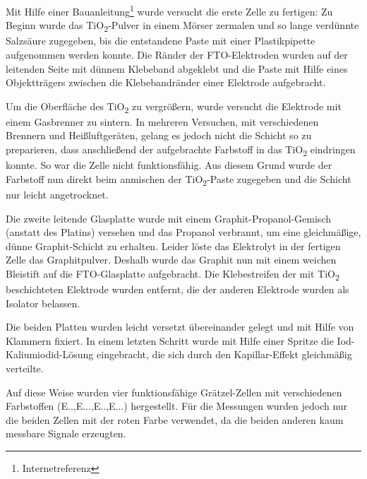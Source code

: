 \documentclass[11pt]{scrartcl}
\begin{document}
Mit Hilfe einer Bauanleitung\footnote{Internetreferenz} wurde versucht die erste Zelle zu fertigen: Zu Beginn wurde das TiO\textsubscript{2}-Pulver in einem Mörser zermalen und so lange verdünnte Salzsäure zugegeben, bis die entstandene Paste mit einer Plastikpipette aufgenommen werden konnte. Die Ränder der FTO-Elektroden wurden auf der leitenden Seite mit dünnem Klebeband abgeklebt und die Paste mit Hilfe eines Objektträgers zwischen die Klebebandränder einer Elektrode aufgebracht.

Um die Oberfläche des TiO\textsubscript{2} zu vergrößern, wurde versucht die Elektrode mit einem Gasbrenner zu sintern. In mehreren Versuchen, mit verschiedenen Brennern und Heißluftgeräten, gelang es jedoch nicht die Schicht so zu preparieren, dass anschließend der aufgebrachte Farbstoff in das TiO\textsubscript{2} eindringen konnte. So war die Zelle nicht funktionsfähig. Aus diesem Grund wurde der Farbstoff nun direkt beim anmischen der TiO\textsubscript{2}-Paste zugegeben und die Schicht nur leicht angetrocknet.

Die zweite leitende Glasplatte wurde mit einem Graphit-Propanol-Gemisch (anstatt des Platins) versehen und das Propanol verbrannt, um eine gleichmäßige, dünne Graphit-Schicht zu erhalten. Leider löste das Elektrolyt in der fertigen Zelle das Graphitpulver. Deshalb wurde das Graphit nun mit einem weichen Bleistift auf die FTO-Glasplatte aufgebracht. Die Klebestreifen der mit TiO\textsubscript{2} beschichteten Elektrode wurden entfernt, die der anderen Elektrode wurden als Isolator belassen.

Die beiden Platten wurden leicht versetzt übereinander gelegt und mit Hilfe von Klammern fixiert. In einem letzten Schritt wurde mit Hilfe einer Spritze die Iod-Kaliumiodid-Lösung eingebracht, die sich durch den Kapillar-Effekt gleichmäßig verteilte.

Auf diese Weise wurden vier funktionsfähige Grätzel-Zellen mit verschiedenen Farbstoffen (E..,E...,E..,E...) hergestellt. Für die Messungen wurden jedoch nur die beiden Zellen mit der roten Farbe verwendet, da die beiden anderen kaum messbare Signale erzeugten. %
\end{document}
